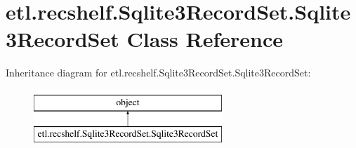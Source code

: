 \hypertarget{classetl_1_1recshelf_1_1Sqlite3RecordSet_1_1Sqlite3RecordSet}{\section{etl.\-recshelf.\-Sqlite3\-Record\-Set.\-Sqlite3\-Record\-Set Class Reference}
\label{classetl_1_1recshelf_1_1Sqlite3RecordSet_1_1Sqlite3RecordSet}
}
Inheritance diagram for etl.\-recshelf.\-Sqlite3\-Record\-Set.\-Sqlite3\-Record\-Set\-:\begin{figure}[H]
\begin{center}
\leavevmode
\includegraphics[height=2.000000cm]{classetl_1_1recshelf_1_1Sqlite3RecordSet_1_1Sqlite3RecordSet}
\end{center}
\end{figure}
